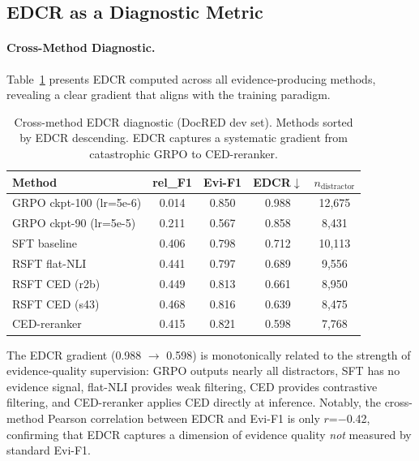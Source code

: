 \documentclass[11pt,a4paper]{article}
\newcommand{\edcr}{EDCR}
\begin{document}
\subsection{\edcr{} as a Diagnostic Metric}
\label{sec:edcr_analysis}

\paragraph{Cross-Method Diagnostic.}
Table~\ref{tab:edcr_diagnostic} presents \edcr{} computed across all evidence-producing methods, revealing a clear gradient that aligns with the training paradigm.

\begin{table}[t]
\centering
\small
\caption{Cross-method \edcr{} diagnostic (DocRED dev set). Methods sorted by \edcr{} descending. \edcr{} captures a systematic gradient from catastrophic GRPO to CED-reranker.}
\label{tab:edcr_diagnostic}
\begin{tabular}{@{}lcccc@{}}
\toprule
\textbf{Method} & \textbf{rel\_F1} & \textbf{Evi-F1} & \textbf{\edcr{}$\downarrow$} & \textbf{$n_{\text{distractor}}$} \\
\midrule
GRPO ckpt-100 (lr=5e-6) & 0.014 & 0.850 & 0.988 & 12,675 \\
GRPO ckpt-90 (lr=5e-5)  & 0.211 & 0.567 & 0.858 & 8,431 \\
SFT baseline             & 0.406 & 0.798 & 0.712 & 10,113 \\
RSFT flat-NLI            & 0.441 & 0.797 & 0.689 & 9,556 \\
RSFT CED (r2b)           & 0.449 & 0.813 & 0.661 & 8,950 \\
RSFT CED (s43)           & 0.468 & 0.816 & 0.639 & 8,475 \\
CED-reranker             & 0.415 & 0.821 & 0.598 & 7,768 \\
\bottomrule
\end{tabular}
\end{table}

The \edcr{} gradient (0.988 $\to$ 0.598) is monotonically related to the strength of evidence-quality supervision: GRPO outputs nearly all distractors, SFT has no evidence signal, flat-NLI provides weak filtering, CED provides contrastive filtering, and CED-reranker applies CED directly at inference.
Notably, the cross-method Pearson correlation between \edcr{} and Evi-F1 is only $r$=$-$0.42, confirming that \edcr{} captures a dimension of evidence quality \emph{not} measured by standard Evi-F1.
\end{document}
